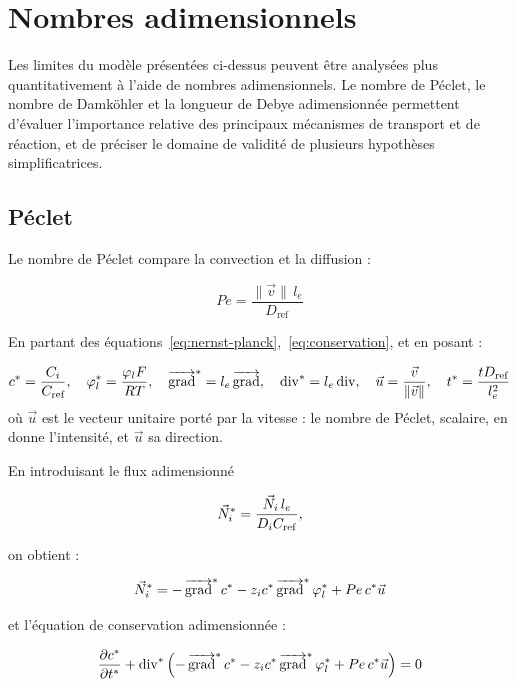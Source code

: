 \section*{Nombres adimensionnels}

Les limites du modèle présentées ci-dessus peuvent être analysées 
plus quantitativement à l'aide de nombres adimensionnels. Le nombre 
de Péclet, le nombre de Damköhler et la longueur de Debye adimensionnée 
permettent d'évaluer l'importance relative des principaux mécanismes de 
transport et de réaction, et de préciser le domaine de validité de plusieurs 
hypothèses simplificatrices.

\subsection*{Péclet}

Le nombre de Péclet compare la convection et la diffusion :

\begin{equation}
Pe = \frac{\|\vec{v}\|\,l_e}{D_{\text{ref}}}
\end{equation}

En partant des équations~\eqref{eq:nernst-planck},~\eqref{eq:conservation}, et en posant :

\begin{equation*}
c^* = \frac{C_i}{C_{\text{ref}}}, \quad 
\varphi_l^* = \frac{\varphi_l F}{RT}, \quad 
\mathop{\overrightarrow{\operatorname{grad}}}\nolimits^* = l_e\mathop{\overrightarrow{\operatorname{grad}}}\nolimits, \quad
\operatorname{div}^* = l_e\operatorname{div}, \quad
\vec{u} = \frac{\vec{v}}{\|\vec{v}\|}, \quad
t^* = \frac{t D_{\text{ref}}}{l_e^2}
\end{equation*}
où $\vec{u}$ est le vecteur unitaire porté par la vitesse : le nombre de Péclet,
scalaire, en donne l'intensité, et $\vec{u}$ sa direction.

En introduisant le flux adimensionné

\[
\vec{N}_i^*=\frac{\vec{N}_i\, l_e}{D_iC_{\rm ref}},
\]

on obtient :

\begin{equation*}
\vec{N}_i^* = -\mathop{\overrightarrow{\operatorname{grad}}}\nolimits^* c^* - z_i c^* \mathop{\overrightarrow{\operatorname{grad}}}\nolimits^* \varphi_l^* + Pe\, c^* \vec{u}
\end{equation*}

et l'équation de conservation adimensionnée :

\begin{equation*}
\frac{\partial c^*}{\partial t^*} + \operatorname{div}^* \left(-\mathop{\overrightarrow{\operatorname{grad}}}\nolimits^* c^* - z_i c^* \mathop{\overrightarrow{\operatorname{grad}}}\nolimits^* \varphi_l^* + Pe\, c^* \vec{u}\right) = 0
\end{equation*}

